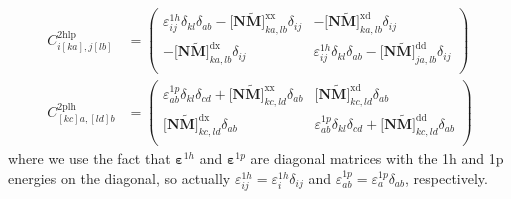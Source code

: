 \begin{align}
    {C}^{2 \mathrm{hlp}}_{i[ka],j[lb]} &= \begin{pmatrix}
{\varepsilon}^{1h}_{ij}\delta_{kl} \delta_{ab} - \bigl[\mathbf{N} \tilde{\mathbf{M}}\bigr]^{\mathrm{xx}}_{ka,lb} \delta _{ij} & - \bigl[\mathbf{N} \tilde{\mathbf{M}}\bigr]^{\mathrm{xd}}_{ka,lb} \delta _{ij} \\
- \bigl[\mathbf{N} \tilde{\mathbf{M}}\bigr]^{\mathrm{dx}}_{ka,lb}\delta _{ij} & {\varepsilon}^{1h}_{ij}\delta_{kl} \delta_{ab} - \bigl[\mathbf{N} \tilde{\mathbf{M}}\bigr]^{\mathrm{dd}}_{ja,lb} \delta _{ij} \\
\end{pmatrix} \\
{C}^{2 \mathrm{plh}}_{[kc]a,[ld]b} &= \begin{pmatrix}
{\varepsilon}^{1p}_{ab}\delta_{kl} \delta_{cd} + \bigl[\mathbf{N} \tilde{\mathbf{M}}\bigr]^{\mathrm{xx}}_{kc,ld} \delta _{ab} &  \bigl[\mathbf{N} \tilde{\mathbf{M}}\bigr]^{\mathrm{xd}}_{kc,ld} \delta _{ab} \\ 
    \bigl[\mathbf{N} \tilde{\mathbf{M}}\bigr]^{\mathrm{dx}}_{kc,ld}\delta _{ab} & {\varepsilon}^{1p}_{ab}\delta_{kl} \delta_{cd} + \bigl[\mathbf{N} \tilde{\mathbf{M}}\bigr]^{\mathrm{dd}}_{kc,ld} \delta _{ab} \\
\end{pmatrix}
\end{align}
where we use the fact that $\bm{\varepsilon}^{1h}$ and $\bm{\varepsilon}^{1p}$ are diagonal matrices with the 1h and 1p energies on the diagonal, so actually $\varepsilon^{1h}_{ij} = \varepsilon^{1h}_i \delta_{ij}$ and $\varepsilon^{1p}_{ab} = \varepsilon^{1p}_a \delta_{ab}$, respectively.

